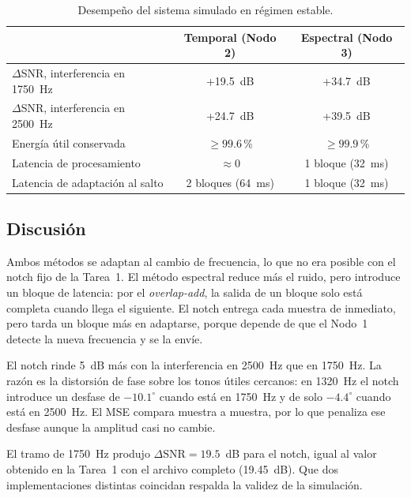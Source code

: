\documentclass[11pt,a4paper]{article}
\begin{document}
\begin{table}[h]
  \centering
  \begin{tabular}{lcc}
    \toprule
    & Temporal (Nodo 2) & Espectral (Nodo 3) \\
    \midrule
    $\Delta$SNR, interferencia en 1750~Hz & +19.5~dB & +34.7~dB \\
    $\Delta$SNR, interferencia en 2500~Hz & +24.7~dB & +39.5~dB \\
    Energía útil conservada & $\geq 99.6$\,\% & $\geq 99.9$\,\% \\
    Latencia de procesamiento & $\approx 0$ & 1 bloque (32~ms) \\
    Latencia de adaptación al salto & 2 bloques (64~ms) & 1 bloque (32~ms) \\
    \bottomrule
  \end{tabular}
  \caption{Desempeño del sistema simulado en régimen estable.}
  \label{tab:resultados}
\end{table}
 
\subsection{Discusión}
Ambos métodos se adaptan al cambio de frecuencia, lo que no era posible con
el notch fijo de la Tarea~1. El método espectral reduce más el ruido, pero
introduce un bloque de latencia: por el \emph{overlap-add}, la salida de un
bloque solo está completa cuando llega el siguiente. El notch entrega cada
muestra de inmediato, pero tarda un bloque más en adaptarse, porque depende
de que el Nodo~1 detecte la nueva frecuencia y se la envíe.
 
El notch rinde 5~dB más con la interferencia en 2500~Hz que en 1750~Hz. La
razón es la distorsión de fase sobre los tonos útiles cercanos: en 1320~Hz
el notch introduce un desfase de $-10.1^\circ$ cuando está en 1750~Hz y de
solo $-4.4^\circ$ cuando está en 2500~Hz. El MSE compara muestra a muestra,
por lo que penaliza ese desfase aunque la amplitud casi no cambie.
 
El tramo de 1750~Hz produjo $\Delta\text{SNR} = 19.5$~dB para el notch, igual
al valor obtenido en la Tarea~1 con el archivo completo (19.45~dB). Que dos
implementaciones distintas coincidan respalda la validez de la simulación.
 
\end{document}
